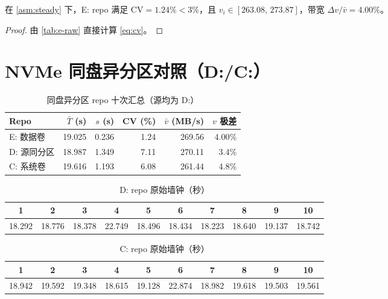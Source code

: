 \begin{lemma}[E: 低方差稳态]
\label{lem:e-low-cv}
在 \cref{asm:steady} 下，E: repo 满足 $\mathrm{CV}=1.24\% < 3\%$，且
$v_i\in[263.08,\,273.87]$，带宽 $\Delta v/\bar{v}=4.00\%$。
\end{lemma}

\begin{proof}
由 \cref{tab:e-raw} 直接计算 \cref{eq:cv}。
\end{proof}

\section{NVMe 同盘异分区对照（D:/C:）}\label{sec:partition}

\begin{table}[htbp]
\centering
\caption{同盘异分区 repo 十次汇总（源均为 D:）}
\label{tab:partition}
\small
\begin{tabular}{@{}l rrr rr@{}}
\toprule
Repo & $\bar{T}$ (s) & $s$ (s) & CV (\%) & $\bar{v}$ (MB/s) & $v$ 极差 \\
\midrule
E: 数据卷 & 19.025 & 0.236 & 1.24 & 269.56 & 4.00\% \\
D: 源同分区 & 18.987 & 1.349 & 7.11 & 270.11 & 3.4\% \\
C: 系统卷 & 19.616 & 1.193 & 6.08 & 261.44 & 4.8\% \\
\bottomrule
\end{tabular}
\end{table}

\begin{table}[htbp]
\centering
\caption{D: repo 原始墙钟（秒）}
\label{tab:d-raw}
\footnotesize
\begin{tabular}{@{}*{10}{c}@{}}
\toprule
1 & 2 & 3 & 4 & 5 & 6 & 7 & 8 & 9 & 10 \\
\midrule
18.292 & 18.776 & 18.378 & 22.749 & 18.496 & 18.434 & 18.223 & 18.640 & 19.137 & 18.742 \\
\bottomrule
\end{tabular}
\end{table}

\begin{table}[htbp]
\centering
\caption{C: repo 原始墙钟（秒）}
\label{tab:c-raw}
\footnotesize
\begin{tabular}{@{}*{10}{c}@{}}
\toprule
1 & 2 & 3 & 4 & 5 & 6 & 7 & 8 & 9 & 10 \\
\midrule
18.942 & 19.592 & 19.348 & 18.615 & 19.128 & 22.874 & 18.982 & 19.618 & 19.503 & 19.561 \\
\bottomrule
\end{tabular}
\end{table}

